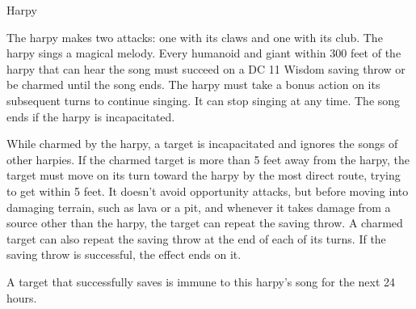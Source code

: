 	\begin{DndMonster}[width=\textwidth + 8pt]{Harpy}
		\begin{multicols}{2}
		\DndMonsterBasics[armor-class={11}, hit-points={38 (7d8 + 7)}, speed={20 ft., fly 40 ft.}]
		\DndMonsterDetails[saving-throws={}, skills={}, damage-immunities={}, damage-resistances={}, damage-vulnerabilities={}, condition-immunities={}, senses={passive Perception 10}, languages={Common}, challenge={1 (200 XP)}]
		 The harpy makes two attacks: one with its claws and one with its club.
		\DndMonsterAttack[
			name=Claws,
			distance=melee,
			type=weapon,
			mod=+3,
			reach=5,
			dmg=\DndDice{2d4 + 1},
			dmg-type=slashing
		]
		\DndMonsterAttack[
			name=Club,
			distance=melee,
			type=weapon,
			mod=+3,
			reach=5,
			dmg=\DndDice{1d4 + 1},
			dmg-type=bludgeoning
		]
		The harpy sings a magical melody. Every humanoid and giant within 300 feet of the harpy that can hear the song must succeed on a DC 11 Wisdom saving throw or be charmed until the song ends. The harpy must take a bonus action on its subsequent turns to continue singing. It can stop singing at any time. The song ends if the harpy is incapacitated.
		
		While charmed by the harpy, a target is incapacitated and ignores the songs of other harpies. If the charmed target is more than 5 feet away from the harpy, the target must move on its turn toward the harpy by the most direct route, trying to get within 5 feet. It doesn't avoid opportunity attacks, but before moving into damaging terrain, such as lava or a pit, and whenever it takes damage from a source other than the harpy, the target can repeat the saving throw. A charmed target can also repeat the saving throw at the end of each of its turns. If the saving throw is successful, the effect ends on it.
		
		A target that successfully saves is immune to this harpy's song for the next 24 hours.
		\end{multicols}
		\end{DndMonster}
		

